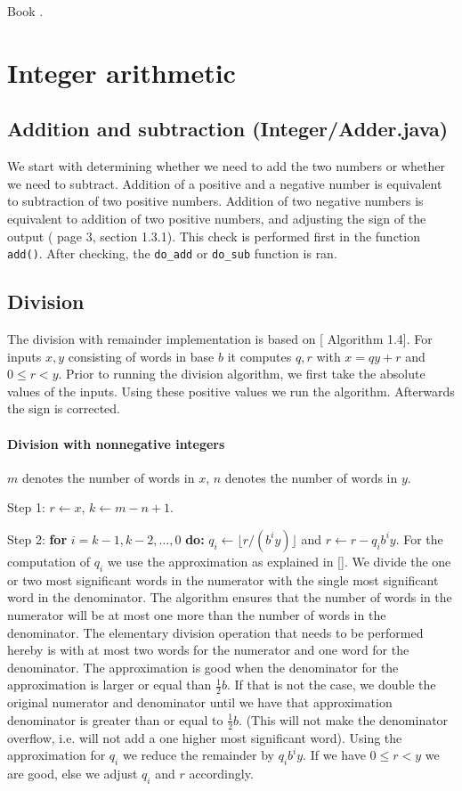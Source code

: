 \documentclass[a4paper]{article}
\begin{document}
Book \cite{ant}.

\section{Integer arithmetic}

\subsection{Addition and subtraction (Integer/Adder.java)}

We start with determining whether we need to add the two numbers or whether we need to subtract.
Addition of a positive and a negative number is equivalent to subtraction of two positive numbers.
Addition of two negative numbers is equivalent to addition of two positive numbers, and adjusting the sign of the output
(\cite{ant} page 3, section 1.3.1).
This check is performed first in the function \texttt{add()}.
After checking, the \texttt{do\_add} or \texttt{do\_sub} function is ran.


\subsection{Division}

The division with remainder implementation is based on [\cite{ant} Algorithm 1.4].
For inputs $x, y$ consisting of words in base $b$ it computes $q, r$ with $x=qy+r$ and $0 \le r < y$.
Prior to running the division algorithm, we first take the absolute values of the inputs.
Using these positive values we run the algorithm.
Afterwards the sign is corrected.

\paragraph{Division with nonnegative integers}
$m$ denotes the number of words in $x$, $n$ denotes the number of words in $y$.

Step 1: $r \gets x$, $k \gets m - n + 1$.

Step 2: \textbf{for} $i = k-1, k-2, \ldots, 0$ \textbf{do:}
$q_i \gets \lfloor r / (b^i y) \rfloor$ and $r \gets r - q_i b^i y$.
For the computation of $q_i$ we use the approximation as explained in [\cite{ant}].
We divide the one or two most significant words in the numerator with the single most significant word in the denominator. The algorithm ensures that the number of words in the numerator will be at most one more than the number of words in the denominator.
The elementary division operation that needs to be performed hereby is with at most two words for the numerator and one word for the denominator.
The approximation is good when the denominator for the approximation is larger or equal than $\frac{1}{2} b$. If that is not the case, we double the original numerator and denominator until we have that approximation denominator is greater than or equal to $\frac{1}{2} b$. (This will not make the denominator overflow, i.e. will not add a one higher most significant word).
Using the approximation for $q_i$ we reduce the remainder by $q_i b^i y$.
If we have $0 \le r < y$ we are good, else we adjust $q_i$ and $r$ accordingly.
\end{document}
